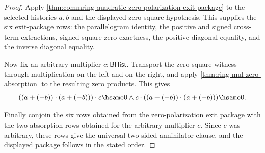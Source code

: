 \begin{proof}
Apply \autoref{thm:commring-quadratic-zero-polarization-exit-package} to the
selected histories $a,b$ and the displayed zero-square hypothesis. This supplies
the six exit-package rows: the parallelogram identity, the positive and signed
cross-term extractions, signed-square zero exactness, the positive diagonal
equality, and the inverse diagonal equality.

Now fix an arbitrary multiplier $c:\mathsf{BHist}$. Transport the zero-square
witness through multiplication on the left and on the right, and apply
\autoref{thm:ring-mul-zero-absorption} to the resulting zero products. This
gives
$$
((a+(-b))\cdot(a+(-b)))\cdot c\hsame0
\land
c\cdot((a+(-b))\cdot(a+(-b)))\hsame0.
$$

Finally conjoin the six rows obtained from the zero-polarization exit package
with the two absorption rows obtained for the arbitrary multiplier $c$. Since
$c$ was arbitrary, these rows give the universal two-sided annihilator clause,
and the displayed package follows in the stated order.
\end{proof}

